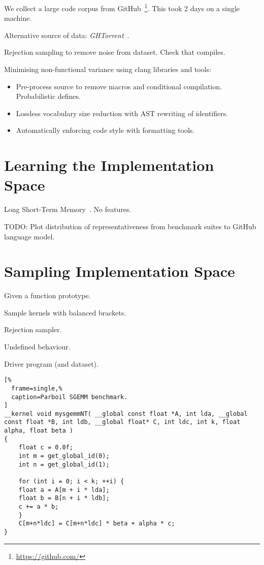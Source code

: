 \documentclass[preprint,nonatbib,10pt,nocopyrightspace]{sigplanconf}
\begin{document}
We collect a large code corpus from
GitHub~\footnote{\url{https://github.com/}}. This took 2 days on a
single machine.

Alternative source of data: \emph{GHTorrent}~\cite{Gousios2014a}.

Rejection sampling to remove noise from dataset. Check that compiles.

Minimising non-functional variance using clang libraries and tools:
\begin{itemize}
\item Pre-process source to remove macros and conditional
  compilation. Probabilistic defines.
\item Lossless vocabulary size reduction with AST rewriting of
  identifiers.
\item Automatically enforcing code style with formatting tools.
\end{itemize}


\section{Learning the Implementation Space}\label{sec:ml}

Long Short-Term Memory~\cite{Hochreiter1997}. No features.

TODO: Plot distribution of representativeness from benchmark suites to
GitHub language model.


\section{Sampling Implementation Space}\label{sec:}

Given a function prototype.

Sample kernels with balanced brackets.

Rejection sampler.

Undefined behaviour.

Driver program (and dataset).

\lstset{language=[OpenCL]C}
\begin{lstlisting}[%
  frame=single,%
  caption=Parboil SGEMM benchmark.
]
__kernel void mysgemmNT( __global const float *A, int lda, __global const float *B, int ldb, __global float* C, int ldc, int k, float alpha, float beta )
{
    float c = 0.0f;
    int m = get_global_id(0);
    int n = get_global_id(1);

    for (int i = 0; i < k; ++i) {
	float a = A[m + i * lda];
	float b = B[n + i * ldb];
	c += a * b;
    }
    C[m+n*ldc] = C[m+n*ldc] * beta + alpha * c;
}
\end{lstlisting}
\end{document}
